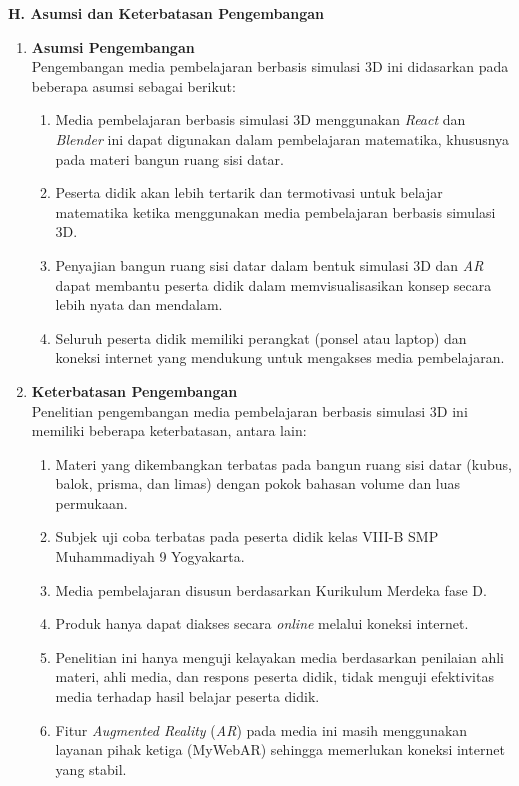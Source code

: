\textbf{H. Asumsi dan Keterbatasan Pengembangan}

\begin{enumerate}
    \item \textbf{Asumsi Pengembangan} \\
    Pengembangan media pembelajaran berbasis simulasi 3D ini didasarkan pada beberapa asumsi sebagai berikut:
    \begin{enumerate}
        \item Media pembelajaran berbasis simulasi 3D menggunakan \textit{React} dan \textit{Blender} ini dapat digunakan dalam pembelajaran matematika, khususnya pada materi bangun ruang sisi datar.
        \item Peserta didik akan lebih tertarik dan termotivasi untuk belajar matematika ketika menggunakan media pembelajaran berbasis simulasi 3D.
        \item Penyajian bangun ruang sisi datar dalam bentuk simulasi 3D dan \textit{AR} dapat membantu peserta didik dalam memvisualisasikan konsep secara lebih nyata dan mendalam.
        \item Seluruh peserta didik memiliki perangkat (ponsel atau laptop) dan koneksi internet yang mendukung untuk mengakses media pembelajaran.
    \end{enumerate}

    \item \textbf{Keterbatasan Pengembangan} \\
    Penelitian pengembangan media pembelajaran berbasis simulasi 3D ini memiliki beberapa keterbatasan, antara lain:
    \begin{enumerate}
        \item Materi yang dikembangkan terbatas pada bangun ruang sisi datar (kubus, balok, prisma, dan limas) dengan pokok bahasan volume dan luas permukaan.
        \item Subjek uji coba terbatas pada peserta didik kelas VIII-B SMP Muhammadiyah 9 Yogyakarta.
        \item Media pembelajaran disusun berdasarkan Kurikulum Merdeka fase D.
        \item Produk hanya dapat diakses secara \textit{online} melalui koneksi internet.
        \item Penelitian ini hanya menguji kelayakan media berdasarkan penilaian ahli materi, ahli media, dan respons peserta didik, tidak menguji efektivitas media terhadap hasil belajar peserta didik.
        \item Fitur \textit{Augmented Reality} (\textit{AR}) pada media ini masih menggunakan layanan pihak ketiga (MyWebAR) sehingga memerlukan koneksi internet yang stabil.
    \end{enumerate}
\end{enumerate}

